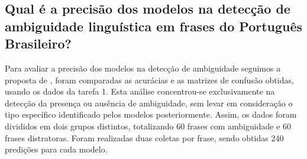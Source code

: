 \subsection{Qual é a precisão dos modelos na detecção de ambiguidade linguística em frases do Português Brasileiro?}\label{resultados-q-1}

Para avaliar a precisão dos modelos na detecção de ambiguidade seguimos a proposta de \cite{freitag2021funccao}, foram comparadas as acurácias e as matrizes de confusão obtidas, usando os dados da tarefa 1. Esta análise concentrou-se exclusivamente na detecção da presença ou ausência de ambiguidade, sem levar em consideração o tipo específico identificado pelos modelos posteriormente. Assim, os dados foram divididos em dois grupos distintos, totalizando 60 frases com ambiguidade e 60 frases distratoras. Foram realizadas duas coletas por frase, sendo obtidas 240 predições para cada modelo.


